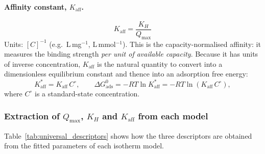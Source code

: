 \documentclass[12pt]{article}
\begin{document}
	\paragraph{Affinity constant, $K_{\mathrm{aff}}$.}
	\begin{equation}
		\boxed{
			K_{\mathrm{aff}}
			= \frac{K_H}{Q_{\max}}
		}
		\label{eq:Kaff_universal}
	\end{equation}
	Units: $[C]^{-1}$ (e.g.\ L\,mg$^{-1}$, L\,mmol$^{-1}$).
	This is the capacity-normalised affinity: it measures the binding
	strength \emph{per unit of available capacity}.  Because it has
	units of inverse concentration, $K_{\mathrm{aff}}$ is the natural
	quantity to convert into a dimensionless equilibrium constant and
	thence into an adsorption free energy:
	\begin{equation}
		K_{\mathrm{aff}}^{\ast}
		= K_{\mathrm{aff}}\, C^\circ,
		\qquad
		\Delta G_{\mathrm{ads}}^{0}
		= -RT\ln K_{\mathrm{aff}}^{\ast}
		= -RT\ln(K_{\mathrm{aff}}\, C^\circ),
		\label{eq:DG_from_Kaff}
	\end{equation}
	where $C^\circ$ is a standard-state concentration.

	\subsubsection{Extraction of $Q_{\max}$, $K_H$ and $K_{\mathrm{aff}}$ from each model}

	Table~\ref{tab:universal_descriptors} shows how the three
	descriptors are obtained from the fitted parameters of each
	isotherm model.
\end{document}
